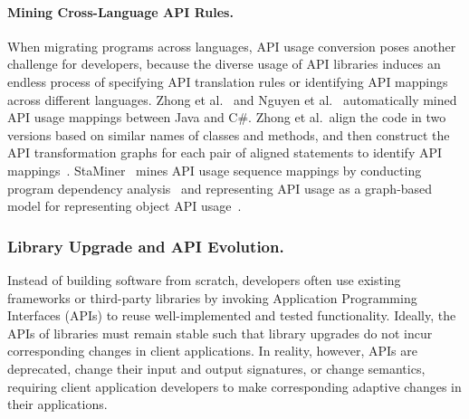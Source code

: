 \paragraph{{Mining Cross-Language API Rules.}}
When migrating programs across languages, API usage conversion poses another challenge for developers, because the diverse usage of API libraries induces an endless process of specifying API translation rules or identifying API mappings across different languages. Zhong et al.~\cite{zhong2010mining} and Nguyen et al.~\cite{nguyen2014statistical,Nguyen:2017:EAE} automatically mined API usage mappings between Java and C\#. Zhong et al.~align the code in two versions based on similar names of classes and methods, and then construct the API transformation graphs for each pair of aligned statements to identify API mappings~\cite{zhong2010mining}. StaMiner~\cite{nguyen2014statistical} mines API usage sequence mappings by conducting program dependency analysis~\cite{Muchnick:1998} and representing API usage as a graph-based model for representing object API usage~\cite{Nguyen09}. %

\subsubsection{Library Upgrade and API Evolution.}
Instead of building software from scratch, developers often use existing frameworks or third-party libraries by invoking Application Programming Interfaces (APIs) to reuse well-implemented and tested functionality. Ideally, the APIs of libraries must remain stable such that library upgrades do not incur corresponding changes in client applications. In reality, however, APIs are deprecated, change their input and output signatures, or change semantics, requiring client application developers to make corresponding adaptive changes in their applications.  

